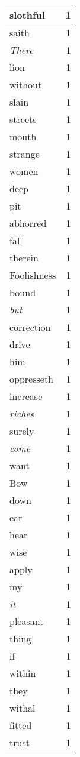 \begin{center}
\begin{longtable}{l|r}
slothful & 1\\ \hline 
saith & 1\\ \hline 
\emph{There} & 1\\ \hline 
lion & 1\\ \hline 
without & 1\\ \hline 
slain & 1\\ \hline 
streets & 1\\ \hline 
mouth & 1\\ \hline 
strange & 1\\ \hline 
women & 1\\ \hline 
deep & 1\\ \hline 
pit & 1\\ \hline 
abhorred & 1\\ \hline 
fall & 1\\ \hline 
therein & 1\\ \hline 
Foolishness & 1\\ \hline 
bound & 1\\ \hline 
\emph{but} & 1\\ \hline 
correction & 1\\ \hline 
drive & 1\\ \hline 
him & 1\\ \hline 
oppresseth & 1\\ \hline 
increase & 1\\ \hline 
\emph{riches} & 1\\ \hline 
surely & 1\\ \hline 
\emph{come} & 1\\ \hline 
want & 1\\ \hline 
Bow & 1\\ \hline 
down & 1\\ \hline 
ear & 1\\ \hline 
hear & 1\\ \hline 
wise & 1\\ \hline 
apply & 1\\ \hline 
my & 1\\ \hline 
\emph{it} & 1\\ \hline 
pleasant & 1\\ \hline 
thing & 1\\ \hline 
if & 1\\ \hline 
within & 1\\ \hline 
they & 1\\ \hline 
withal & 1\\ \hline 
fitted & 1\\ \hline 
trust & 1\\ \hline 

\end{longtable}
\end{center}

